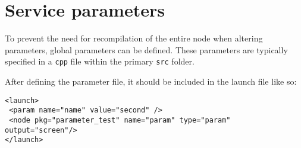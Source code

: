 \section{Service parameters}

To prevent the need for recompilation of the entire node when altering parameters, global parameters can be defined. 
These parameters are typically specified in a \texttt{cpp} file within the primary \texttt{src} folder. 

After defining the parameter file, it should be included in the launch file like so:
\begin{verbatim}
<launch>
 <param name="name" value="second" />
 <node pkg="parameter_test" name="param" type="param" output="screen"/>
</launch>
\end{verbatim}